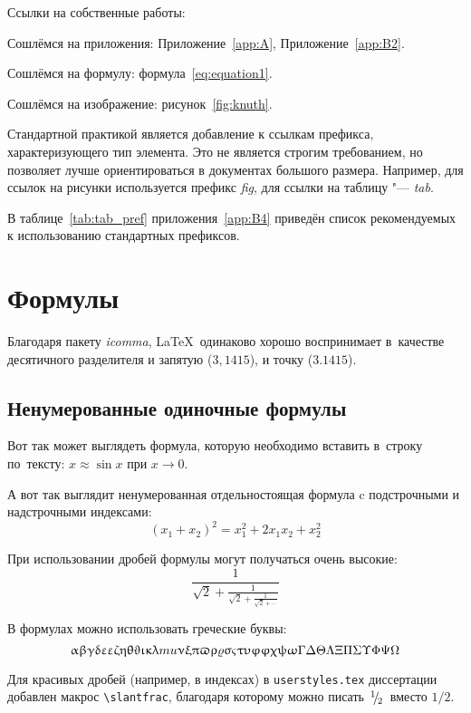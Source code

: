 Ссылки на собственные работы:~\cite{vakbib1, confbib1}

Сошлёмся на приложения: Приложение~\ref{app:A}, Приложение~\ref{app:B2}.

Сошлёмся на формулу: формула~\eqref{eq:equation1}.

Сошлёмся на изображение: рисунок~\ref{fig:knuth}.

Стандартной практикой является добавление к ссылкам префикса, характеризующего тип элемента.
Это не является строгим требованием, но позволяет лучше ориентироваться в документах большого размера.
Например, для ссылок на рисунки используется префикс \textit{fig},
для ссылки на таблицу "--- \textit{tab}.

В таблице~\ref{tab:tab_pref} приложения~\ref{app:B4} приведён список рекомендуемых
к использованию стандартных префиксов.

\section{Формулы}\label{sec:ch1/sec3}

Благодаря пакету \textit{icomma}, \LaTeX~одинаково хорошо воспринимает
в~качестве десятичного разделителя и запятую (\(3,1415\)), и точку (\(3.1415\)).

\subsection{Ненумерованные одиночные формулы}\label{subsec:ch1/sec3/sub1}

Вот так может выглядеть формула, которую необходимо вставить в~строку
по~тексту: \(x \approx \sin x\) при \(x \to 0\).

А вот так выглядит ненумерованная отдельностоящая формула c подстрочными
и надстрочными индексами:
\[
(x_1+x_2)^2 = x_1^2 + 2 x_1 x_2 + x_2^2
\]

При использовании дробей формулы могут получаться очень высокие:
\[
  \frac{1}{\sqrt{2}+
  \displaystyle\frac{1}{\sqrt{2}+
  \displaystyle\frac{1}{\sqrt{2}+\cdots}}}
\]

В формулах можно использовать греческие буквы:
\[
\alpha\beta\gamma\delta\epsilon\varepsilon\zeta\eta\theta\vartheta\iota\kappa%
\lambda\\mu\nu\xi\pi\varpi\rho\varrho\sigma\varsigma\tau\upsilon\phi\varphi%
\chi\psi\omega\Gamma\Delta\Theta\Lambda\Xi\Pi\Sigma\Upsilon\Phi\Psi\Omega
\]

Для красивых дробей (например, в индексах) в
\verb+userstyles.tex+ диссертации добавлен макрос
\verb+\slantfrac+, благодаря которому можно
писать \(\hspace{3pt}\!^{1}\!\!\hspace{1pt}/ \hspace{2pt}\!\!_{2}\!\hspace{3pt}\) вместо \(1/2\).

